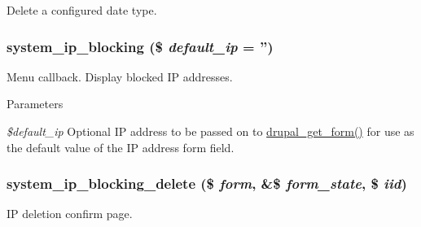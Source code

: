 \label{system_8admin_8inc_af8f1dc0f2dda0917fc8b8e03d81f3979}
Delete a configured date type. \hypertarget{system_8admin_8inc_a68bcf98eaaedb0085bcb2efe025f7d5f}{
\subsubsection[{system\_\-ip\_\-blocking}]{\setlength{\rightskip}{0pt plus 5cm}system\_\-ip\_\-blocking (\$ {\em default\_\-ip} = {\ttfamily ''})}}
\label{system_8admin_8inc_a68bcf98eaaedb0085bcb2efe025f7d5f}
Menu callback. Display blocked IP addresses.


\begin{DoxyParams}{Parameters}
\item[{\em \$default\_\-ip}]Optional IP address to be passed on to \hyperlink{group__form__api_ga720df81a837b06dfe19daf1c1eea3437}{drupal\_\-get\_\-form()} for use as the default value of the IP address form field. \end{DoxyParams}
\hypertarget{system_8admin_8inc_a15ba20664b3e8b66e0f0a4d8b54e2f60}{
\subsubsection[{system\_\-ip\_\-blocking\_\-delete}]{\setlength{\rightskip}{0pt plus 5cm}system\_\-ip\_\-blocking\_\-delete (\$ {\em form}, \/  \&\$ {\em form\_\-state}, \/  \$ {\em iid})}}
\label{system_8admin_8inc_a15ba20664b3e8b66e0f0a4d8b54e2f60}
IP deletion confirm page.

